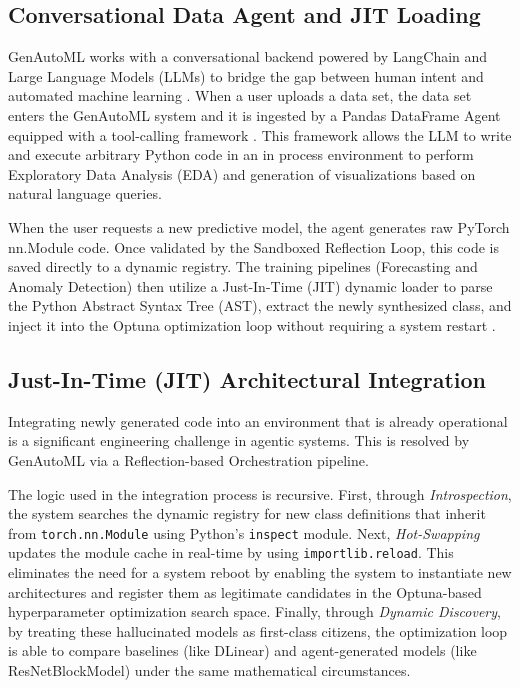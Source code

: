 \documentclass{article}
\begin{document}
\subsection{Conversational Data Agent and JIT Loading}
 GenAutoML works with a conversational backend powered by LangChain and Large Language Models (LLMs) to bridge the gap between human intent and automated machine learning \cite{yao2022react}. When a user uploads a data set, the data set enters the GenAutoML system and it is ingested by a Pandas DataFrame Agent equipped with a tool-calling framework \cite{schick2023toolformer}. This framework allows the LLM to write and execute arbitrary Python code in an in process environment to perform Exploratory Data Analysis (EDA) and generation of visualizations based on natural language queries.

 When the user requests a new predictive model, the agent generates raw PyTorch nn.Module code. Once validated by the Sandboxed Reflection Loop, this code is saved directly to a dynamic registry. The training pipelines (Forecasting and Anomaly Detection) then utilize a Just-In-Time (JIT) dynamic loader to parse the Python Abstract Syntax Tree (AST), extract the newly synthesized class, and inject it into the Optuna optimization loop without requiring a system restart \cite{akiba2019optuna}.

\subsection{Just-In-Time (JIT) Architectural Integration}
Integrating newly generated code into an environment that is already operational is a significant engineering challenge in agentic systems. This is resolved by GenAutoML via a Reflection-based Orchestration pipeline.

The logic used in the integration process is recursive. First, through \textit{Introspection}, the system searches the dynamic registry for new class definitions that inherit from \texttt{torch.nn.Module} using Python's \texttt{inspect} module. Next, \textit{Hot-Swapping} updates the module cache in real-time by using \texttt{importlib.reload}. This eliminates the need for a system reboot by enabling the system to instantiate new architectures and register them as legitimate candidates in the Optuna-based hyperparameter optimization search space. Finally, through \textit{Dynamic Discovery}, by treating these hallucinated models as first-class citizens, the optimization loop is able to compare baselines (like DLinear) \cite{zeng2022are} and agent-generated models (like ResNetBlockModel) \cite{he2016} under the same mathematical circumstances.
\end{document}
